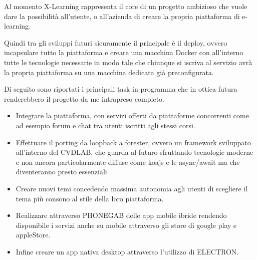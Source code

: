 Al momento X-Learning rappresenta il core di un progetto ambizioso che vuole dare la possibilità all'utente, o all'azienda di creare la propria piattaforma di e-learning.

Quindi tra gli sviluppi futuri sicuramente il principale è il deploy, ovvero incapsulare tutto la piattaforma e creare una macchina Docker con all'interno tutte le tecnologie necessarie in modo tale che chiunque si iscriva al servizio avrà la propria piattaforma su una macchina dedicata già preconfigurata.

Di seguito sono riportati i principali task in programma che in ottica futura renderebbero il progetto da me intrapreso completo.

\begin{itemize}
  \item Integrare la piattaforma, con servizi offerti da piattaforme concorrenti come ad esempio forum e chat tra utenti iscritti agli stessi corsi.

  \item Effettuare il porting da loopback a forester, ovvero un framework sviluppato all'interno del CVDLAB, che guarda al futuro sfruttando tecnologie moderne e non ancora particolarmente diffuse come koajs e le async/await ma che diventeranno presto essenziali 

  \item Creare nuovi temi concedendo massima autonomia agli utenti di scegliere il tema più consono al stile della loro piattaforma.

  \item Realizzare attraverso PHONEGAB delle app mobile ibride rendendo disponibile i servizi anche su mobile attraverso gli store di google play e appleStore.

  \item Infine creare un app nativa desktop attraverso l'utilizzo di ELECTRON.

\end{itemize}